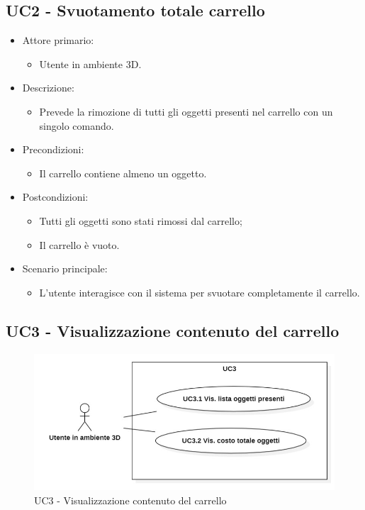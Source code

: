 \subsection{UC2 - Svuotamento totale carrello}
\begin{itemize}
	
	\item Attore primario: 
	\begin{itemize}
		\item Utente in ambiente 3D.
	\end{itemize}
	\item Descrizione:
	\begin{itemize}
		\item Prevede la rimozione di tutti gli oggetti presenti nel carrello con un singolo comando.
	\end{itemize}
	
	\item Precondizioni:
	\begin{itemize}
		\item Il carrello contiene almeno un oggetto.
	\end{itemize}
	
	\item Postcondizioni:
	\begin{itemize}
		\item Tutti gli oggetti sono stati rimossi dal carrello;
		\item Il carrello è vuoto.
	\end{itemize}
	
	\item Scenario principale:
	\begin{itemize}
		\item L'utente interagisce con il sistema per svuotare completamente il carrello.
	\end{itemize}
	
\end{itemize}

\pagebreak

\subsection{UC3 - Visualizzazione contenuto del carrello}

\begin{figure}[H]
  \renewcommand{\thefigure}{1}
  \includegraphics[width=\linewidth]{./res/images/UC3.png}
  \caption{UC3 - Visualizzazione contenuto del carrello}
  \label{fig:UC 3}
\end{figure}

